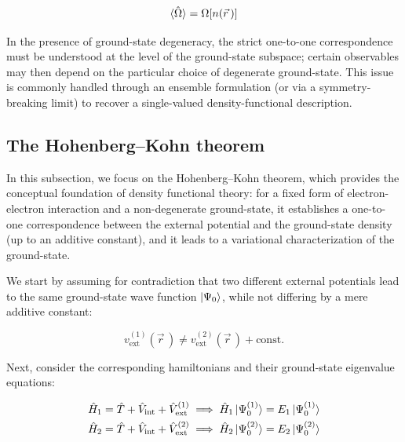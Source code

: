 \begin{equation}
    \braket{\hat{\Omega}}=\Omega[n(\vec{r}\,)]
\label{functional_from_expectation}
\end{equation}

In the presence of ground-state degeneracy, the strict one-to-one correspondence must be understood at the level of the ground-state subspace; certain observables may then depend on the particular choice of degenerate ground-state. This issue is commonly handled through an ensemble formulation (or via a symmetry-breaking limit) to recover a single-valued density-functional description.

\subsection{The Hohenberg--Kohn theorem}

In this subsection, we focus on the Hohenberg--Kohn theorem, which provides the conceptual foundation of density functional theory: for a fixed form of electron-electron interaction and a non-degenerate ground-state, it establishes a one-to-one correspondence between the external potential and the ground-state density (up to an additive constant), and it leads to a variational characterization of the ground-state.

We start by assuming for contradiction that two different external potentials lead to the same ground-state wave function $\ket{\Psi_0}$, while not differing by a mere additive constant:

\begin{equation}
    v^{(1)}_\mathrm{ext}(\vec{r}\,)\neq v^{(2)}_\mathrm{ext}(\vec{r}\,)+\mathrm{const.}
\label{V_ext}
\end{equation}

Next, consider the corresponding hamiltonians and their ground-state eigenvalue equations:

\begin{equation}
\begin{aligned}
    \hat{H}_1=\hat{T}+\hat{V}_\mathrm{int}+\hat{V}_\mathrm{ext}^{(1)} &\implies \hat{H}_1\ket{\Psi_0^{(1)}}=E_1\ket{\Psi_0^{(1)}} \\
    \hat{H}_2=\hat{T}+\hat{V}_\mathrm{int}+\hat{V}_\mathrm{ext}^{(2)} &\implies \hat{H}_2\ket{\Psi_0^{(2)}}=E_2\ket{\Psi_0^{(2)}}
\end{aligned}
\label{different_hamiltonians_schrodinger_equation}
\end{equation}

